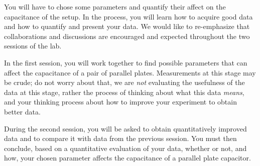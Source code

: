 \documentclass[12pt]{report}
\begin{document}
You will have to chose some parameters and quantify their affect on the capacitance of the setup. In the process, you will learn how to acquire good data and how to quantify and present your data. We would like to re-emphasize that collaborations and discussions are encouraged and expected throughout the two sessions of the lab.

In the first session, you will work together to find possible parameters that can affect the capacitance of a pair of parallel plates. Measurements at this stage may be crude; do not worry about that, we are {\it not} evaluating the usefulness of the data at this stage, rather the process of thinking about what this data {\it means}, and your thinking process about how to improve your experiment to obtain better data.

During the second session, you will be asked to obtain quantitatively improved data and to compare it with data from the previous session. You must then conclude, based on a quantitative evaluation of your data, whether or not, and how, your chosen parameter affects the capacitance of a parallel plate capacitor. \\
\end{document}

